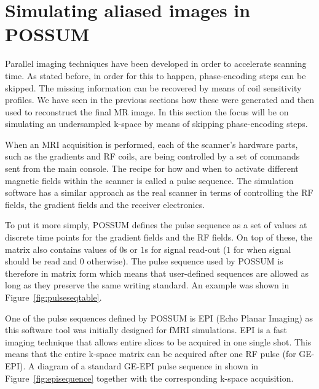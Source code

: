 % 

\section{Simulating aliased images in POSSUM}
\label{ch4sectionaliased}
Parallel imaging techniques have been developed in order to accelerate scanning time. As stated before, in order for this to happen, phase-encoding steps can be skipped. The missing information can be recovered by means of coil sensitivity profiles. We have seen in the previous sections how these were generated and then used to reconstruct the final MR image. In this section the focus will be on simulating an undersampled k-space by means of skipping phase-encoding steps.

When an MRI acquisition is performed, each of the scanner's hardware parts, such as the gradients and RF coils, are being controlled by a set of commands sent from the main console. The recipe for how and when to activate different magnetic fields within the scanner is called a pulse sequence. The simulation software has a similar approach as the real scanner in terms of controlling the RF fields, the gradient fields and the receiver electronics. 

To put it more simply, POSSUM defines the pulse sequence as a set of values at discrete time points for the gradient fields and the RF fields. On top of these, the matrix also contains values of $0$s or $1$s for signal read-out ($1$ for when signal should be read and $0$ otherwise). The pulse sequence used by POSSUM is therefore in matrix form which means that user-defined sequences are allowed as long as they preserve the same writing standard. An example was shown in Figure~\ref{fig:pulseseqtable}.

One of the pulse sequences defined by POSSUM is EPI (Echo Planar Imaging) as this software tool was initially designed for fMRI simulations. EPI is a fast imaging technique that allows entire slices to be acquired in one single shot. This means that the entire k-space matrix can be acquired after one RF pulse (for GE-EPI). A diagram of a standard GE-EPI pulse sequence in shown in Figure~\ref{fig:episequence} together with the corresponding k-space acquisition. 

